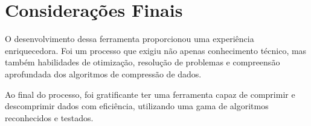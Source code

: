 \section{Considerações Finais}
O desenvolvimento dessa ferramenta proporcionou uma experiência enriquecedora. Foi um processo que exigiu não apenas conhecimento técnico, mas também habilidades de otimização, resolução de problemas e compreensão aprofundada dos algoritmos de compressão de dados.

Ao final do processo, foi gratificante ter uma ferramenta capaz de comprimir e descomprimir dados com eficiência, utilizando uma gama de algoritmos reconhecidos e testados.
